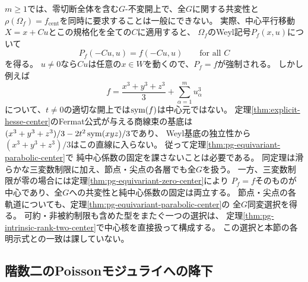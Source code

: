 \begin{remark}[純中心係数の固定と平行移動]
\label{rem:pg-equivariant-pure-center-obstruction}
$m\geq1$では、零切断全体を含む$G$-不変開上で、全$G$に関する共変性と
$\rho(\Omega_f)=f_{\mathrm{cent}}$を同時に要求することは一般にできない。
実際、中心平行移動$X=x+Cu$とこの規格化を全ての$C$に適用すると、
$\Omega_f$のWeyl記号$P_f(x,u)$について
\begin{equation}
 P_f(-Cu,u)=f(-Cu,u)\qquad\text{for all }C
 \label{eq:pg-equivariant-pure-center-evaluation}
\end{equation}
を得る。
$u\ne0$なら$Cu$は任意の$x\in W$を動くので、$P_f=f$が強制される。
しかし例えば
\begin{equation}
 f=\frac{x^3+y^3+z^3}{3}+\sum_{\alpha=1}^m u_\alpha^3
 \label{eq:pg-equivariant-pure-center-fermat}
\end{equation}
について、$t\ne0$の適切な開上では$\operatorname{sym}(f)$は中心元ではない。
定理\ref{thm:explicit-hesse-center}のFermat公式が与える商線束の基底は
$(x^3+y^3+z^3)/3-2t^2\operatorname{sym}(xyz)/3$であり、
Weyl基底の独立性から$(x^3+y^3+z^3)/3$はこの直線に入らない。
従って定理\ref{thm:pg-equivariant-parabolic-center}で
純中心係数の固定を課さないことは必要である。
同定理は滑らかな三変数制限に加え、節点・尖点の各層でも全$G$を扱う。
一方、三変数制限が零の場合には定理\ref{thm:pg-equivariant-zero-center}により
$P_f=f$そのものが中心であり、全$G$への共変性と純中心係数の固定は両立する。
節点・尖点の各軌道についても、定理\ref{thm:pg-equivariant-parabolic-center}の
全$G$同変選択を得る。
可約・非被約制限も含めた型をまたぐ一つの選択は、
定理\ref{thm:pg-intrinsic-rank-two-center}で中心核を直接扱って構成する。
この選択と本節の各明示式との一致は課していない。
\end{remark}

\subsection{階数二のPoissonモジュライへの降下}

